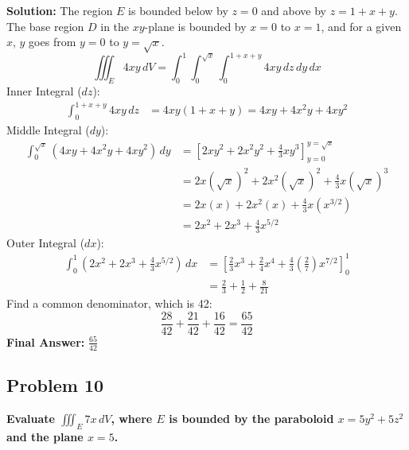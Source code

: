 \documentclass[12pt]{article}
\begin{document}
\textbf{Solution:}
The region $E$ is bounded below by $z=0$ and above by $z = 1+x+y$. 
The base region $D$ in the $xy$-plane is bounded by $x=0$ to $x=1$, and for a given $x$, $y$ goes from $y=0$ to $y=\sqrt{x}$.
\[ \iiint_E 4xy \, dV = \int_{0}^{1} \int_{0}^{\sqrt{x}} \int_{0}^{1+x+y} 4xy \, dz \, dy \, dx \]
Inner Integral ($dz$):
\begin{align*} 
\int_{0}^{1+x+y} 4xy \, dz &= 4xy(1+x+y) = 4xy + 4x^2y + 4xy^2
\end{align*}
Middle Integral ($dy$):
\begin{align*} 
\int_{0}^{\sqrt{x}} (4xy + 4x^2y + 4xy^2) \, dy &= \left[ 2xy^2 + 2x^2y^2 + \frac{4}{3}xy^3 \right]_{y=0}^{y=\sqrt{x}} \\
&= 2x(\sqrt{x})^2 + 2x^2(\sqrt{x})^2 + \frac{4}{3}x(\sqrt{x})^3 \\
&= 2x(x) + 2x^2(x) + \frac{4}{3}x(x^{3/2}) \\
&= 2x^2 + 2x^3 + \frac{4}{3}x^{5/2}
\end{align*}
Outer Integral ($dx$):
\begin{align*} 
\int_{0}^{1} \left( 2x^2 + 2x^3 + \frac{4}{3}x^{5/2} \right) \, dx &= \left[ \frac{2}{3}x^3 + \frac{2}{4}x^4 + \frac{4}{3} \left( \frac{2}{7} \right) x^{7/2} \right]_{0}^{1} \\
&= \frac{2}{3} + \frac{1}{2} + \frac{8}{21}
\end{align*}
Find a common denominator, which is 42:
\[ \frac{28}{42} + \frac{21}{42} + \frac{16}{42} = \frac{65}{42} \]
\textbf{Final Answer:} $\frac{65}{42}$

\vspace{0.5cm}
\subsection*{Problem 10}
\textbf{Evaluate $\iiint_E 7x \, dV$, where $E$ is bounded by the paraboloid $x = 5y^2 + 5z^2$ and the plane $x = 5$.}
\end{document}
